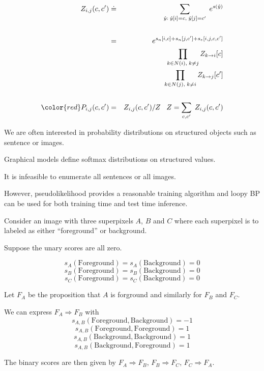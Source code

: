 {\begin{eqnarray*}
Z_{i,j}(c,c') & \doteq & \sum_{\hat{y}:\; \hat{y}[i] = c,\;\hat{y}[j] = c'} \;e^{s(\hat{y})} \\
\\
& = & e^{s_n[i,c] + s_n[j,c'] +s_e[i,j,c,c']} \\
& & \prod_{k\in N(i),\;k \not = j} Z_{k \rightarrow i}[c] \\
& & \prod_{k\in N(j),\;k \not = i} Z_{k \rightarrow j}[c'] \\
\\
{\color{red} P_{i,j}(c,c')} & = & Z_{i,j}(c,c')/Z\;\;\;Z = \sum_{c,c'}\;Z_{i,j}(c,c')
\end{eqnarray*}



We are often interested in probability distributions on structured objects such as sentence or images.

\vfill
Graphical models define softmax distributions on structured values.

\vfill
It is infeasible to enumerate all sentences or all images.

\vfill
However, pseudolikelihood provides a reasonable training algorithm and loopy BP can be used for both training time and test time
inference.


}




Consider an image with three superpixels $A$, $B$ and $C$ where
each superpixel is to labeled as either ``foreground'' or background.

\vfill
Suppose the unary scores are all zero.

\vfill
$$s_A(\mathrm{Foreground}) = s_A(\mathrm{Background}) = 0$$
$$s_B(\mathrm{Foreground}) = s_B(\mathrm{Background}) = 0$$
$$s_C(\mathrm{Foreground}) = s_C(\mathrm{Background}) = 0$$



\vfill
Let $F_A$ be the proposition that $A$ is forground and similarly for $F_B$ and $F_C$.

\vfill
We can express $F_A \Rightarrow F_B$ with
$$s_{A,B}(\mathrm{Foreground},\mathrm{Background}) = -1$$
$$s_{A,B}(\mathrm{Foreground},\mathrm{Foreground}) = 1$$
$$s_{A,B}(\mathrm{Background},\mathrm{Background}) = 1$$
$$s_{A,B}(\mathrm{Background},\mathrm{Foreground}) = 1$$

\vfill
The binary scores are then given by
$F_A \Rightarrow F_B$, $F_B \Rightarrow F_C$, $F_C \Rightarrow F_A$.

